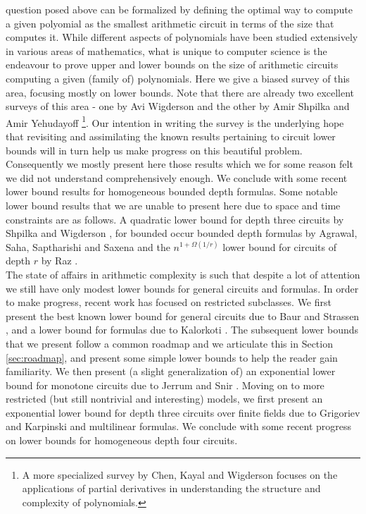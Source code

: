 	question posed above can be formalized by defining the optimal 
	way to compute a given polyomial as the smallest arithmetic 
	circuit in terms of the size that computes it. While different aspects 
	of polynomials have been studied extensively in various areas of 
	mathematics, what is unique to computer science is the endeavour to 
	prove upper and lower bounds on the size of arithmetic circuits 
	computing a given (family of) polynomials. Here we give a biased 
	survey of this area, focusing mostly on lower bounds. Note that
	there are already two excellent surveys of this area - one by Avi 
	Wigderson \cite{aviSurvey} and the other by Amir Shpilka and Amir 
	Yehudayoff \cite{sy}\footnote{
		A more specialized survey by Chen, Kayal and Wigderson \cite{ckw11}
		focuses on the applications of partial derivatives in understanding 
		the structure and complexity of polynomials. 
	}. Our intention in writing the survey is the underlying hope 
	that revisiting and assimilating the known results pertaining to 
	circuit lower bounds will in turn help us make progress on this 
	beautiful problem. Consequently we mostly present here those 
	results which we for some reason felt we did not understand 
	comprehensively enough. We conclude with some recent lower 
	bound results for homogeneous bounded depth formulas. Some 
	notable lower bound results that we are unable to present 
	here due to space and time constraints are as follows. A 
	quadratic lower bound for depth three circuits by Shpilka and Wigderson \cite{sw2001}, for bounded occur 
	bounded depth formulas by Agrawal, Saha, Saptharishi and 
	Saxena \cite{ASSS12} and the $n^{1 + \Omega(1/r)}$ lower bound for 
	circuits of depth $r$ by Raz \cite{raz10}.\\

The state of affairs in arithmetic complexity is such that despite a
lot of attention we still have only modest lower bounds for general
circuits and formulas. In order to make progress, recent work has
focused on restricted subclasses.  We first present the best known
lower bound for general circuits due to Baur and Strassen \cite{BS83},
and a lower bound for formulas due to Kalorkoti
\cite{k85}. The subsequent lower bounds that we present
follow a common roadmap and we articulate this in Section
\ref{sec:roadmap}, and present some simple lower bounds to help the
reader gain familiarity. We then present (a slight generalization of)
an exponential lower bound for monotone circuits due to Jerrum and
Snir \cite{js82}.  Moving on to more restricted (but still nontrivial
and interesting) models, we first present an exponential lower bound
for depth three circuits over finite fields due to Grigoriev and
Karpinski \cite{grigoriev98} and multilinear formulas. We conclude
with some recent progress on lower bounds for homogeneous depth four
circuits.
	 
